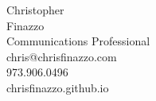 \documentclass[10pt,oneside,final]{article}
\begin{document}
  \thispagestyle{empty}
  \vspace*{\fill}
  \begin{center}
       {\large{Christopher}}\\
       {\large{Finazzo}}\\
        {\normalsize{Communications Professional}}\\
       {\small{chris@chrisfinazzo.com}}\\
       {\small{973.906.0496}}\\
       {\small{chrisfinazzo.github.io}}\\
  \end{center}
  \vspace*{\fill}
\end{document}

